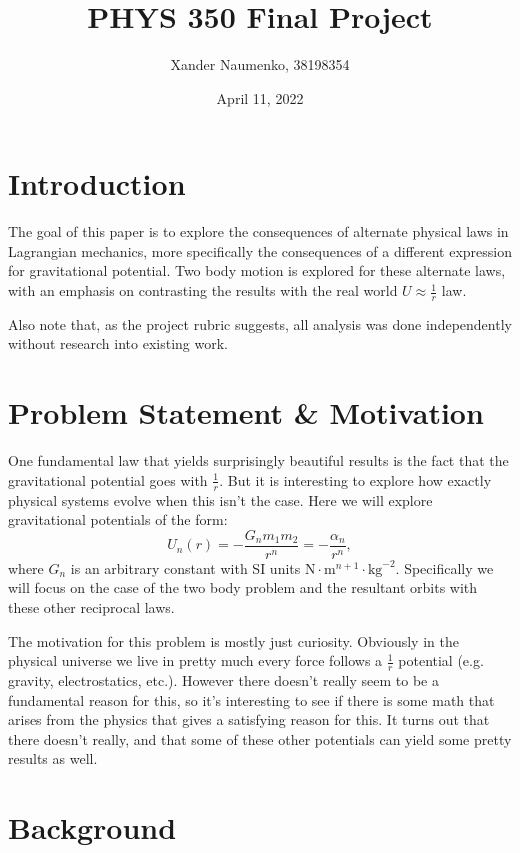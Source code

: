 \documentclass[letterpaper, reqno,11pt]{article}
\begin{document}
\title{PHYS 350 Final Project}
\date{April 11, 2022}
\author{Xander Naumenko, 38198354}
\maketitle

\tableofcontents

\section{Introduction}
 
The goal of this paper is to explore the consequences of alternate physical laws in Lagrangian mechanics, more specifically the consequences of a different expression for gravitational potential. Two body motion is explored for these alternate laws, with an emphasis on contrasting the results with the real world $U\approx\frac{1}{r}$ law. 

Also note that, as the project rubric suggests, all analysis was done independently without research into existing work. 

\section{Problem Statement \& Motivation}

One fundamental law that yields surprisingly beautiful results is the fact that the gravitational potential goes with $\frac{1}{r}$. But it is interesting to explore how exactly physical systems evolve when this isn't the case. Here we will explore gravitational potentials of the form: 
\[
U_n(r)=-\frac{G_nm_1m_2}{r^{n}}=-\frac{\alpha_n}{r^{n}}
,\]
where $G_n$ is an arbitrary constant with SI units $\text{N}\cdot \text{m}^{n+1}\cdot \text{kg}^{-2}$. Specifically we will focus on the case of the two body problem and the resultant orbits with these other reciprocal laws. 

The motivation for this problem is mostly just curiosity. Obviously in the physical universe we live in pretty much every force follows a $\frac{1}{r}$ potential (e.g. gravity, electrostatics, etc.). However there doesn't really seem to be a fundamental reason for this, so it's interesting to see if there is some math that arises from the physics that gives a satisfying reason for this. It turns out that there doesn't really, and that some of these other potentials can yield some pretty results as well. 

\section{Background}
\end{document}
